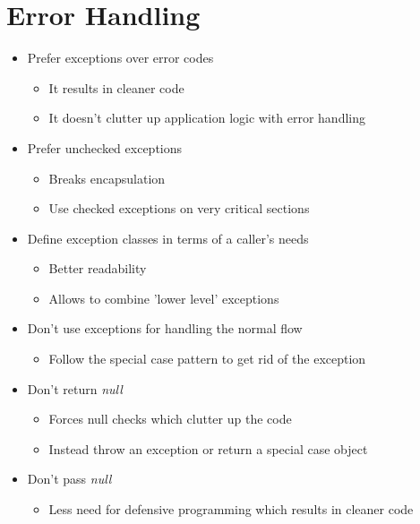 
\section*{Error Handling}
\begin{itemize}
    \item Prefer exceptions over error codes
    \begin{itemize}
        \item It results in cleaner code
        \item It doesn't clutter up application logic with error handling
    \end{itemize}
    \item Prefer unchecked exceptions
    \begin{itemize}
        \item Breaks encapsulation
        \item Use checked exceptions on very critical sections
    \end{itemize}
    \item Define exception classes in terms of a caller's needs
    \begin{itemize}
        \item Better readability
        \item Allows to combine 'lower level' exceptions
    \end{itemize}
    \item Don't use exceptions for handling the normal flow
    \begin{itemize}
        \item Follow the special case pattern to get rid of the exception
    \end{itemize}
    \item Don't return \textit{null}
    \begin{itemize}
        \item Forces null checks which clutter up the code
        \item Instead throw an exception or return a special case object
    \end{itemize}
    \item Don't pass \textit{null}
    \begin{itemize}
        \item Less need for defensive programming which results in cleaner code
    \end{itemize}
\end{itemize}